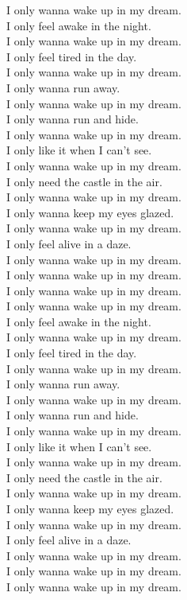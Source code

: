 I only wanna wake up in my dream. \\
I only feel awake in the night. \\
I only wanna wake up in my dream. \\
I only feel tired in the day. \\
I only wanna wake up in my dream. \\
I only wanna run away. \\
I only wanna wake up in my dream. \\
I only wanna run and hide. \\
I only wanna wake up in my dream. \\
I only like it when I can't see. \\
I only wanna wake up in my dream. \\
I only need the castle in the air. \\
I only wanna wake up in my dream. \\
I only wanna keep my eyes glazed. \\
I only wanna wake up in my dream. \\
I only feel alive in a daze. \\
I only wanna wake up in my dream. \\
I only wanna wake up in my dream. \\
I only wanna wake up in my dream. \\

I only wanna wake up in my dream. \\
I only feel awake in the night. \\
I only wanna wake up in my dream. \\
I only feel tired in the day. \\
I only wanna wake up in my dream. \\
I only wanna run away. \\
I only wanna wake up in my dream. \\
I only wanna run and hide. \\
I only wanna wake up in my dream. \\
I only like it when I can't see. \\
I only wanna wake up in my dream. \\
I only need the castle in the air. \\
I only wanna wake up in my dream. \\
I only wanna keep my eyes glazed. \\
I only wanna wake up in my dream. \\
I only feel alive in a daze. \\
I only wanna wake up in my dream. \\
I only wanna wake up in my dream. \\
I only wanna wake up in my dream. \\


